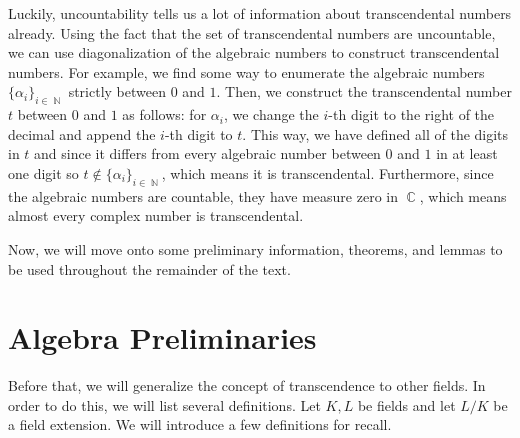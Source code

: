 \documentclass[a4paper, 11pt]{book}
\DeclareMathOperator{\C}{\mathbb{C}}
\DeclareMathOperator{\N}{\mathbb{N}}
\begin{document}
Luckily, uncountability tells us a lot of information about transcendental numbers already. Using the fact that the set of transcendental numbers are uncountable, we can use diagonalization of the algebraic numbers to construct transcendental numbers. For example, we find some way to enumerate the algebraic numbers ${\{\alpha_{i}\}}_{i \in \N}$ strictly between $0$ and $1$. Then, we construct the transcendental number $t$ between $0$ and $1$ as follows: for $\alpha_i$, we change the $i$-th digit to the right of the decimal and append the $i$-th digit to $t$. This way, we have defined all of the digits in $t$ and since it differs from every algebraic number between $0$ and $1$ in at least one digit so $t \notin {\{\alpha_{i}\}}_{i \in \N}$, which means it is transcendental. Furthermore, since the algebraic numbers are countable, they have measure zero in $\C$, which means almost every complex number is transcendental.\par

Now, we will move onto some preliminary information, theorems, and lemmas to be used throughout the remainder of the text.


\section{Algebra Preliminaries}

Before that, we will generalize the concept of transcendence to other fields. In order to do this, we will list several definitions. Let $K, L$ be fields and let $L/K$ be a field extension. We will introduce a few definitions for recall.\par
\end{document}
